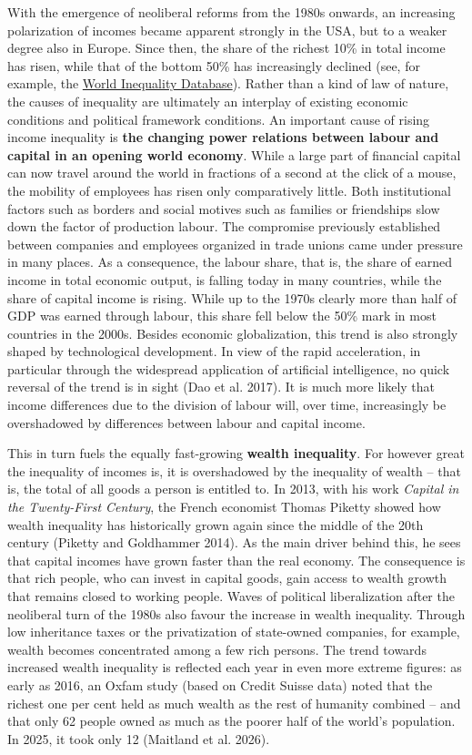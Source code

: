 \documentclass[
  british,
  a4paper,
  DIV=11,
  numbers=noendperiod,
  oneside,
  openany]{scrreprt}
\begin{document}
With the emergence of neoliberal reforms from the 1980s onwards, an
increasing polarization of incomes became apparent strongly in the USA,
but to a weaker degree also in Europe. Since then, the share of the
richest 10\% in total income has risen, while that of the bottom 50\%
has increasingly declined (see, for example, the
\href{https://wid.world/}{World Inequality Database}). Rather than a
kind of law of nature, the causes of inequality are ultimately an
interplay of existing economic conditions and political framework
conditions. An important cause of rising income inequality is
\textbf{the changing power relations between labour and capital in an
opening world economy}. While a large part of financial capital can now
travel around the world in fractions of a second at the click of a
mouse, the mobility of employees has risen only comparatively little.
Both institutional factors such as borders and social motives such as
families or friendships slow down the factor of production labour. The
compromise previously established between companies and employees
organized in trade unions came under pressure in many places. As a
consequence, the labour share, that is, the share of earned income in
total economic output, is falling today in many countries, while the
share of capital income is rising. While up to the 1970s clearly more
than half of GDP was earned through labour, this share fell below the
50\% mark in most countries in the 2000s. Besides economic
globalization, this trend is also strongly shaped by technological
development. In view of the rapid acceleration, in particular through
the widespread application of artificial intelligence, no quick reversal
of the trend is in sight (Dao et al. 2017). It is much more likely that
income differences due to the division of labour will, over time,
increasingly be overshadowed by differences between labour and capital
income.

This in turn fuels the equally fast-growing \textbf{wealth inequality}.
For however great the inequality of incomes is, it is overshadowed by
the inequality of wealth -- that is, the total of all goods a person is
entitled to. In 2013, with his work \emph{Capital in the Twenty-First
Century}, the French economist Thomas Piketty showed how wealth
inequality has historically grown again since the middle of the 20th
century (Piketty and Goldhammer 2014). As the main driver behind this,
he sees that capital incomes have grown faster than the real economy.
The consequence is that rich people, who can invest in capital goods,
gain access to wealth growth that remains closed to working people.
Waves of political liberalization after the neoliberal turn of the 1980s
also favour the increase in wealth inequality. Through low inheritance
taxes or the privatization of state-owned companies, for example, wealth
becomes concentrated among a few rich persons. The trend towards
increased wealth inequality is reflected each year in even more extreme
figures: as early as 2016, an Oxfam study (based on Credit Suisse data)
noted that the richest one per cent held as much wealth as the rest of
humanity combined -- and that only 62 people owned as much as the poorer
half of the world's population. In 2025, it took only 12 (Maitland et
al. 2026).
\end{document}
